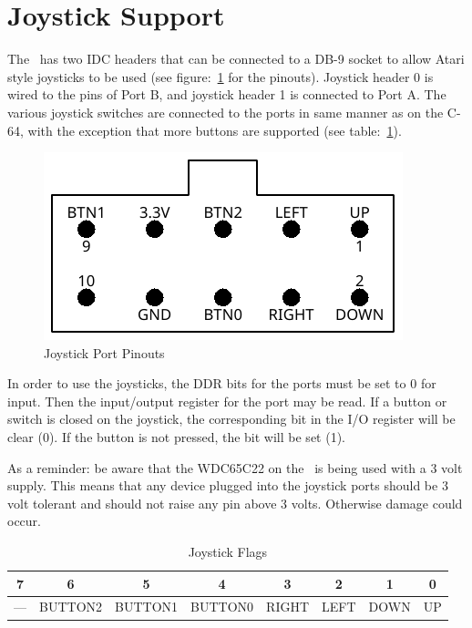 \section{Joystick Support}

The \jr\ has two IDC headers that can be connected to a DB-9 socket to allow Atari style joysticks to be used (see figure:~\ref{fig:joystick_ports} for the pinouts). Joystick header 0 is wired to the pins of Port B, and joystick header 1 is connected to Port A. The various joystick switches are connected to the ports in same manner as on the C-64, with the exception that more buttons are supported (see table:~\ref{tab:via_joystick}).

\begin{figure}[ht]
    \begin{center}
        \includegraphics{images/f256jr_joystick_pinout.pdf}
    \end{center}
    \caption{Joystick Port Pinouts}
    \label{fig:joystick_ports}
\end{figure}

In order to use the joysticks, the DDR bits for the ports must be set to 0 for input. Then the input/output register for the port may be read. If a button or switch is closed on the joystick, the corresponding bit in the I/O register will be clear (0). If the button is not pressed, the bit will be set (1).

As a reminder: be aware that the WDC65C22 on the \jr\ is being used with a 3 volt supply. This means that any device plugged into the joystick ports should be 3 volt tolerant and should not raise any pin above 3 volts. Otherwise damage could occur.

\begin{table}[ht]
    \begin{center}
        \begin{tabular}{|c|c|c|c|c|c|c|c|} \hline
            7 & 6 & 5 & 4 & 3 & 2 & 1 & 0 \\\hline
            --- & BUTTON2 & BUTTON1 & BUTTON0 & RIGHT & LEFT & DOWN & UP \\ \hline
        \end{tabular}
    \end{center}
    \caption{Joystick Flags}
    \label{tab:via_joystick}
\end{table}

